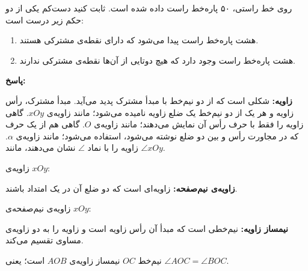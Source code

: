 \begin{example}
	روی خط راستی، ۵۰ پاره‌خط راست داده شده است. ثابت کنید دست‌کم یکی از دو حکم زیر درست است:
	\begin{enumerate}
		\item 
		هشت پاره‌خط راست پیدا می‌شود که دارای نقطه‌ی مشترکی هستند.
		\item 
		هشت پاره‌خط راست وجود دارد که هیچ دوتایی از آن‌ها نقطه‌ی مشترکی ندارند.
	\end{enumerate}
	\textbf{پاسخ:}
\end{example}
\smallskip
\textbf{زاویه:}
شکلی است که از دو نیم‌خط با مبدأ مشترک پدید می‌آید. مبدأ مشترک، رأس زاویه و هر یک از دو نیم‌خط یک ضلع زاویه نامیده می‌شود؛ مانند زاویه‌ی $xOy$. گاهی زاویه را فقط با حرف رأس آن نمایش می‌دهند؛ مانند زاویه‌ی $O$. گاهی هم از یک حرف که در مجاورت رأس و بین دو ضلع نوشته می‌شود، استفاده می‌شود؛ مانند زاویه‌ی
$\alpha$.
زاویه را با نماد
$\angle$
نشان می‌دهند، مانند
$\angle xOy$.
\begin{example}
	زاویه‌ی $xOy$:
	\begin{center}
	\end{center}
\end{example}
\smallskip
\textbf{زاویه‌ی نیم‌صفحه:}
زاویه‌ای است که دو ضلع آن در یک امتداد باشند.
\begin{example}
	زاویه‌ی نیم‌صفحه‌ی $xOy$:
	\begin{center}
	\end{center}
\end{example}
\smallskip
\textbf{نیمساز زاویه:}
نیم‌خطی است که مبدأ آن رأس زاویه است و زاویه را به دو زاویه‌ی مساوی تقسیم می‌کند.
\begin{example}
	نیم‌خط $OC$ نیمساز زاویه‌ی $AOB$ است؛ یعنی
	$\angle AOC = \angle BOC$.
	\begin{center}
	\end{center}
\end{example}
